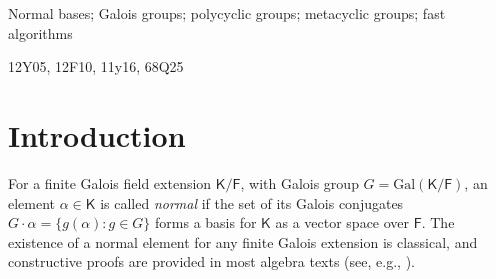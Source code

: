 \begin{keywords}
Normal bases; Galois groups; polycyclic groups; metacyclic groups; fast algorithms
\end{keywords}

\begin{subject}
12Y05, 12F10, 11y16, 68Q25
\end{subject}




\newcommand{\F}{{\mathsf{F}}}
\newcommand{\K}{{\mathsf{K}}}

\newcommand{\NN}{{\mathbb{N}}}
\newcommand{\N}{{\mathbb{N}}}

\def\A{\mathbb{A}}
\def\H{\mathbb{H}}
\def\B{\mathbb{B}}
\def\Z{\mathbb{Z}}
\def\C{\mathbb{C}}
\def\Q{\mathbb{Q}}
\def\D{\mathbb{D}}
\newcommand{\QQ}{\mathbb{Q}}
\newcommand{\mat}[1]{\mathbf{\MakeUppercase{#1}}} %

\newcommand{\osum}[2]{\alpha_{#1,#2}}
\newcommand{\osumcost}{O(n^{(3/4)\cdot \omega(4/3)})}
\newcommand{\osumcosttilde}{\tilde{O}(n^{(3/4)\cdot \omega(4/3)})}
\newcommand{\thecost}{\tilde{O}(n^{(3/4)\cdot \omega(4/3)})}
\newcommand{\alg}{$\tilde{O}(n^{(3/4)\cdot \omega(4/3)})$}

\newcommand{\FF}{{\mathbb{F}}}
\newcommand{\xbar}{\xi}
\newcommand{\zbar}{\zeta}

\newcommand{\citeN}{\citet}






\noacknowledge%
                 

\section{Introduction}

For a finite Galois field extension $\K/\F$, with Galois group $G =
\mathrm{Gal}(\K/\F)$, an element $\alpha \in \K$ is called
\emph{normal} if the set of its Galois conjugates $G \cdot \alpha = \{
g(\alpha): g\in G\}$ forms a basis for $\K$ as a vector space over
$\F$. The existence of a normal element for any finite Galois extension
is classical, and constructive proofs are provided in most algebra
texts (see, e.g., \citealt[Section 6.13]{Lang}).
 
